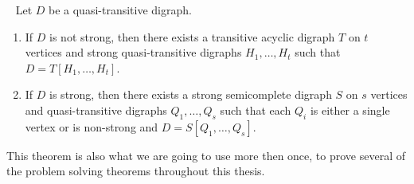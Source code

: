 \begin{thm}~\cite{bangJGT2}
    Let $D$ be a quasi-transitive digraph.
    \label{thm:quasidecom}
    \begin{enumerate}
        \item If $D$ is not strong, then there exists a transitive acyclic digraph $T$ on $t$ vertices and strong quasi-transitive digraphs $H_1,\dots,H_t$ such that $D=T[H_1,\dots,H_t]$.
        \item If $D$ is strong, then there exists a strong semicomplete digraph $S$ on $s$ vertices and quasi-transitive digraphs $Q_1,\dots ,Q_s$ such that each $Q_i$ is either a single vertex or is non-strong and $D=S[Q_1,\dots,Q_s]$.
    \end{enumerate}
\end{thm}
This theorem is also what we are going to use more then once, to prove several of the problem solving theorems throughout this thesis.
